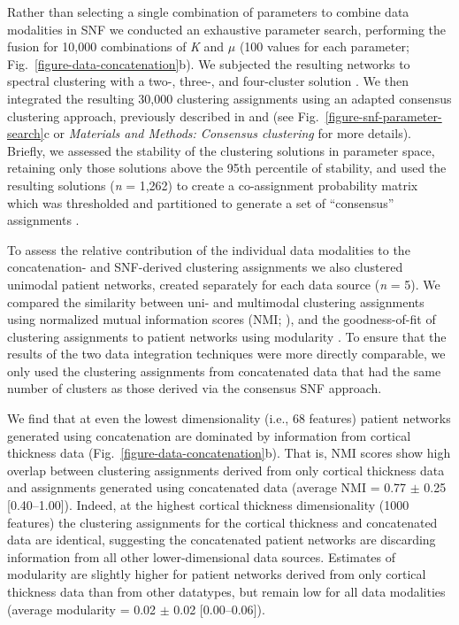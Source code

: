 \documentclass[12pt,aps,pra,reprint,showkeys]{revtex4-1}
\begin{document}
Rather than selecting a single combination of parameters to combine data modalities in SNF we conducted an exhaustive parameter search, performing the fusion for 10,000 combinations of \emph{K} and $\mu$ (100 values for each parameter; Fig.~\ref{figure-data-concatenation}b).
We subjected the resulting networks to spectral clustering with a two-, three-, and four-cluster solution \citep{shi2000normalized, yu2003multiclass}.
We then integrated the resulting 30,000 clustering assignments using an adapted consensus clustering approach, previously described in \citep{bassett2013robust} and \citep{lancichinetti2012consensus} (see Fig.~\ref{figure-snf-parameter-search}c or \textit{Materials and Methods: Consensus clustering} for more details).
Briefly, we assessed the stability of the clustering solutions in parameter space, retaining only those solutions above the 95th percentile of stability, and used the resulting solutions (\emph{n} = 1,262) to create a co-assignment probability matrix which was thresholded and partitioned to generate a set of ``consensus'' assignments \citep{bassett2013robust, blondel2008fast}.

To assess the relative contribution of the individual data modalities to the concatenation- and SNF-derived clustering assignments we also clustered unimodal patient networks, created separately for each data source (\emph{n} = 5).
We compared the similarity between uni- and multimodal clustering assignments using normalized mutual information scores (NMI; \citep{strehl2002cluster}), and the goodness-of-fit of clustering assignments to patient networks using modularity \citep{newman2006modularity}.
To ensure that the results of the two data integration techniques were more directly comparable, we only used the clustering assignments from concatenated data that had the same number of clusters as those derived via the consensus SNF approach.

We find that at even the lowest dimensionality (i.e., 68 features) patient networks generated using concatenation are dominated by information from cortical thickness data (Fig.~\ref{figure-data-concatenation}b).
That is, NMI scores show high overlap between clustering assignments derived from only cortical thickness data and assignments generated using concatenated data (average NMI = 0.77 $\pm$ 0.25 [0.40--1.00]).
Indeed, at the highest cortical thickness dimensionality (1000 features) the clustering assignments for the cortical thickness and concatenated data are identical, suggesting the concatenated patient networks are discarding information from all other lower-dimensional data sources.
Estimates of modularity are slightly higher for patient networks derived from only cortical thickness data than from other datatypes, but remain low for all data modalities (average modularity = 0.02 $\pm$ 0.02 [0.00--0.06]).
\end{document}
